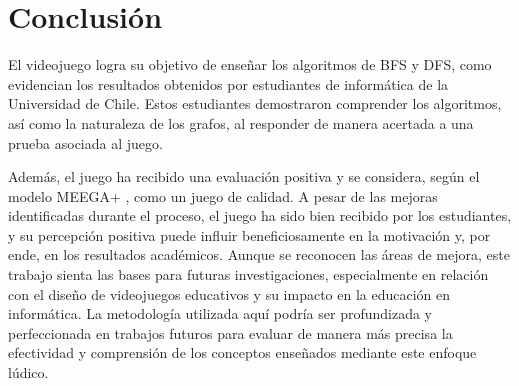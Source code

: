 \chapter{Conclusión}

El videojuego logra su objetivo de enseñar los algoritmos de BFS y DFS, como evidencian los resultados obtenidos por estudiantes de informática de la Universidad de Chile. Estos estudiantes demostraron comprender los algoritmos, así como la naturaleza de los grafos, al responder de manera acertada a una prueba asociada al juego.

Además, el juego ha recibido una evaluación positiva y se considera, según el modelo MEEGA+ \cite{meegaplus}, como un juego de calidad. A pesar de las mejoras identificadas durante el proceso, el juego ha sido bien recibido por los estudiantes, y su percepción positiva puede influir beneficiosamente en la motivación y, por ende, en los resultados académicos. Aunque se reconocen las áreas de mejora, este trabajo sienta las bases para futuras investigaciones, especialmente en relación con el diseño de videojuegos educativos y su impacto en la educación en informática. La metodología utilizada aquí podría ser profundizada y perfeccionada en trabajos futuros para evaluar de manera más precisa la efectividad y comprensión de los conceptos enseñados mediante este enfoque lúdico.







